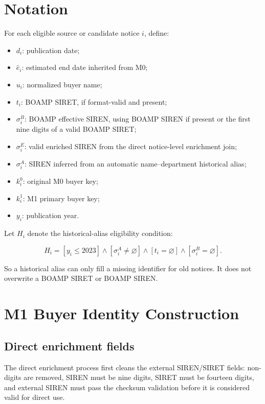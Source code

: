 \documentclass[11pt]{article}
\begin{document}
\section{Notation}
\label{sec:notation}

For each eligible source or candidate notice \(i\), define:

\begin{itemize}
  \item \(d_i\): publication date;
  \item \(\hat{e}_i\): estimated end date inherited from M0;
  \item \(u_i\): normalized buyer name;
  \item \(t_i\): BOAMP SIRET, if format-valid and present;
  \item \(\sigma_i^{B}\): BOAMP effective SIREN, using BOAMP SIREN if
        present or the first nine digits of a valid BOAMP SIRET;
  \item \(\sigma_i^{E}\): valid enriched SIREN from the direct
        notice-level enrichment join;
  \item \(\sigma_i^{A}\): SIREN inferred from an automatic
        name--department historical alias;
  \item \(k_i^{0}\): original M0 buyer key;
  \item \(k_i^{1}\): M1 primary buyer key;
  \item \(y_i\): publication year.
\end{itemize}

Let \(H_i\) denote the historical-alias eligibility condition:

\[
H_i =
\left[
y_i \le 2023
\right]
\land
\left[
\sigma_i^{A} \ne \varnothing
\right]
\land
\left[
t_i = \varnothing
\right]
\land
\left[
\sigma_i^{B} = \varnothing
\right].
\]

So a historical alias can only fill a missing identifier for old notices.
It does not overwrite a BOAMP SIRET or BOAMP SIREN.

\section{M1 Buyer Identity Construction}
\label{sec:identity}

\subsection{Direct enrichment fields}

The direct enrichment process first cleans the external SIREN/SIRET fields:
non-digits are removed, SIREN must be nine digits, SIRET must be fourteen
digits, and external SIREN must pass the checksum validation before it is
considered valid for direct use.
\end{document}

